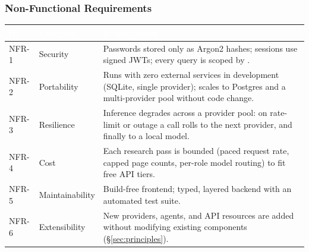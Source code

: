 \documentclass[11pt,a4paper]{article}
\newcommand{\code}[1]{\leavevmode{\color{darkblue}\texttt{#1}}}
\begin{document}
\subsubsection{Non-Functional Requirements}
\begin{tabularx}{\linewidth}{|C{1.35cm}|L{2.7cm}|X|}
\hline
{}\textcolor{white}{\textbf{ID}} & \textcolor{white}{\textbf{Category}} & \textcolor{white}{\textbf{Requirement}} \\
\hline
\mbox{NFR-1} & Security & Passwords stored only as Argon2 hashes; sessions use signed JWTs; every query is scoped by \code{user\_id}. \\
\mbox{NFR-2} & Portability & Runs with zero external services in development (SQLite, single provider); scales to Postgres and a multi-provider pool without code change. \\
\mbox{NFR-3} & Resilience & Inference degrades across a provider pool: on rate-limit or outage a call rolls to the next provider, and finally to a local model. \\
\mbox{NFR-4} & Cost & Each research pass is bounded (paced request rate, capped page counts, per-role model routing) to fit free API tiers. \\
\mbox{NFR-5} & Maintainability & Build-free frontend; typed, layered backend with an automated test suite. \\
\mbox{NFR-6} & Extensibility & New providers, agents, and API resources are added without modifying existing components (\S\ref{sec:principles}). \\
\hline
\end{tabularx}
\end{document}
